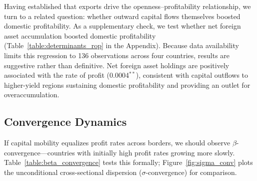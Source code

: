 \documentclass[10pt]{article}
\begin{document}
\par Having established that exports drive the openness--profitability relationship, we turn to a related question: whether outward capital flows themselves boosted domestic profitability. As a supplementary check, we test whether net foreign asset accumulation boosted domestic profitability (Table~\ref{table:determinants_rop} in the Appendix). Because data availability limits this regression to 136 observations across four countries, results are suggestive rather than definitive. Net foreign asset holdings are positively associated with the rate of profit (0.0004$^{**}$), consistent with capital outflows to higher-yield regions sustaining domestic profitability and providing an outlet for overaccumulation.

\subsection{Convergence Dynamics}
\label{subsec:convergence}

If capital mobility equalizes profit rates across borders, we should observe $\beta$-convergence---countries with initially high profit rates growing more slowly. Table~\ref{table:beta_convergence} tests this formally; Figure~\ref{fig:sigma_conv} plots the unconditional cross-sectional dispersion ($\sigma$-convergence) for comparison.
\end{document}
